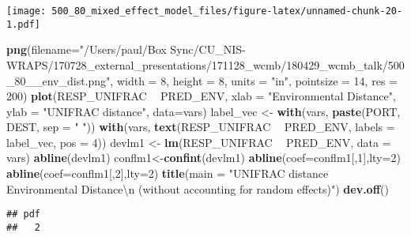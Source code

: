\documentclass[]{article}
\newenvironment{Shaded}{\begin{snugshade}}{\end{snugshade}}
\newcommand{\KeywordTok}[1]{\textcolor[rgb]{0.13,0.29,0.53}{\textbf{#1}}}
\newcommand{\DataTypeTok}[1]{\textcolor[rgb]{0.13,0.29,0.53}{#1}}
\newcommand{\DecValTok}[1]{\textcolor[rgb]{0.00,0.00,0.81}{#1}}
\newcommand{\CharTok}[1]{\textcolor[rgb]{0.31,0.60,0.02}{#1}}
\newcommand{\StringTok}[1]{\textcolor[rgb]{0.31,0.60,0.02}{#1}}
\newcommand{\OperatorTok}[1]{\textcolor[rgb]{0.81,0.36,0.00}{\textbf{#1}}}
\newcommand{\NormalTok}[1]{#1}
\begin{document}
\texttt{[image: 500\_80\_mixed\_effect\_model\_files/figure-latex/unnamed-chunk-20-1.pdf]}

\begin{Shaded}
\begin{Highlighting}[]
\KeywordTok{png}\NormalTok{(}\DataTypeTok{filename=}\StringTok{"/Users/paul/Box Sync/CU_NIS-WRAPS/170728_external_presentations/171128_wcmb/180429_wcmb_talk/500_80__env_dist.png"}\NormalTok{,}
    \DataTypeTok{width =} \DecValTok{8}\NormalTok{, }\DataTypeTok{height =} \DecValTok{8}\NormalTok{, }\DataTypeTok{units =} \StringTok{"in"}\NormalTok{, }\DataTypeTok{pointsize =} \DecValTok{14}\NormalTok{, }\DataTypeTok{res =} \DecValTok{200}\NormalTok{)}
\KeywordTok{plot}\NormalTok{(RESP_UNIFRAC }\OperatorTok{~}\StringTok{ }\NormalTok{PRED_ENV, }\DataTypeTok{xlab =} \StringTok{"Environmental Distance"}\NormalTok{, }\DataTypeTok{ylab =} \StringTok{"UNIFRAC distance"}\NormalTok{, }\DataTypeTok{data=}\NormalTok{vars)}
\NormalTok{label_vec <-}\StringTok{ }\KeywordTok{with}\NormalTok{(vars, }\KeywordTok{paste}\NormalTok{(PORT, DEST, }\DataTypeTok{sep =} \StringTok{" "}\NormalTok{))}
\KeywordTok{with}\NormalTok{(vars, }\KeywordTok{text}\NormalTok{(RESP_UNIFRAC }\OperatorTok{~}\StringTok{ }\NormalTok{PRED_ENV, }\DataTypeTok{labels =}\NormalTok{ label_vec, }\DataTypeTok{pos =} \DecValTok{4}\NormalTok{))}
\NormalTok{devlm1 <-}\StringTok{ }\KeywordTok{lm}\NormalTok{(RESP_UNIFRAC }\OperatorTok{~}\StringTok{ }\NormalTok{PRED_ENV, }\DataTypeTok{data =}\NormalTok{ vars)}
\KeywordTok{abline}\NormalTok{(devlm1)}
\NormalTok{conflm1<-}\KeywordTok{confint}\NormalTok{(devlm1)}
\KeywordTok{abline}\NormalTok{(}\DataTypeTok{coef=}\NormalTok{conflm1[,}\DecValTok{1}\NormalTok{],}\DataTypeTok{lty=}\DecValTok{2}\NormalTok{)}
\KeywordTok{abline}\NormalTok{(}\DataTypeTok{coef=}\NormalTok{conflm1[,}\DecValTok{2}\NormalTok{],}\DataTypeTok{lty=}\DecValTok{2}\NormalTok{) }
\KeywordTok{title}\NormalTok{(}\DataTypeTok{main =} \StringTok{"UNIFRAC distance ~ Environmental Distance}\CharTok{\textbackslash{}n}\StringTok{ (without accounting for random effects)"}\NormalTok{)}
\KeywordTok{dev.off}\NormalTok{()}
\end{Highlighting}
\end{Shaded}

\begin{verbatim}
## pdf 
##   2
\end{verbatim}
\end{document}
